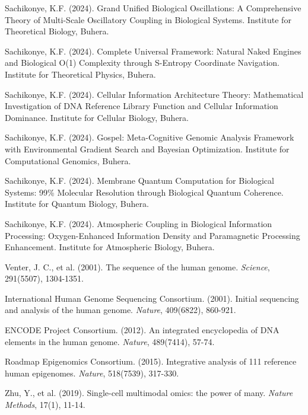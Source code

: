 \documentclass[12pt,a4paper]{article}
\begin{document}
\begin{thebibliography}{99}

Sachikonye, K.F. (2024). Grand Unified Biological Oscillations: A Comprehensive Theory of Multi-Scale Oscillatory Coupling in Biological Systems. Institute for Theoretical Biology, Buhera.

Sachikonye, K.F. (2024). Complete Universal Framework: Natural Naked Engines and Biological O(1) Complexity through S-Entropy Coordinate Navigation. Institute for Theoretical Physics, Buhera.

Sachikonye, K.F. (2024). Cellular Information Architecture Theory: Mathematical Investigation of DNA Reference Library Function and Cellular Information Dominance. Institute for Cellular Biology, Buhera.

Sachikonye, K.F. (2024). Gospel: Meta-Cognitive Genomic Analysis Framework with Environmental Gradient Search and Bayesian Optimization. Institute for Computational Genomics, Buhera.

Sachikonye, K.F. (2024). Membrane Quantum Computation for Biological Systems: 99\% Molecular Resolution through Biological Quantum Coherence. Institute for Quantum Biology, Buhera.

Sachikonye, K.F. (2024). Atmospheric Coupling in Biological Information Processing: Oxygen-Enhanced Information Density and Paramagnetic Processing Enhancement. Institute for Atmospheric Biology, Buhera.

Venter, J. C., et al. (2001). The sequence of the human genome. \textit{Science}, 291(5507), 1304-1351.

International Human Genome Sequencing Consortium. (2001). Initial sequencing and analysis of the human genome. \textit{Nature}, 409(6822), 860-921.

ENCODE Project Consortium. (2012). An integrated encyclopedia of DNA elements in the human genome. \textit{Nature}, 489(7414), 57-74.

Roadmap Epigenomics Consortium. (2015). Integrative analysis of 111 reference human epigenomes. \textit{Nature}, 518(7539), 317-330.

Zhu, Y., et al. (2019). Single-cell multimodal omics: the power of many. \textit{Nature Methods}, 17(1), 11-14.


\end{thebibliography}
\end{document}
